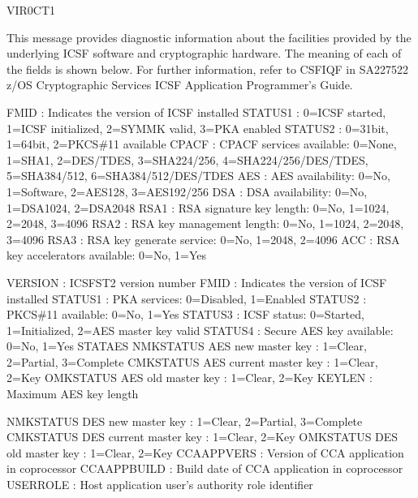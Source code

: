 \documentclass[letterpaper,10pt,english]{sphinxmanual}
\begin{document}
\begin{description}
\sphinxAtStartPar
VIR0CT1

\sphinxAtStartPar
This message provides diagnostic information about the facilities provided by the underlying ICSF software and cryptographic hardware. The meaning of each of the fields is shown below. For further information, refer to CSFIQF in SA22\sphinxhyphen{}7522 z/OS Cryptographic Services ICSF Application Programmer’s Guide.

\sphinxAtStartPar
FMID : Indicates the version of ICSF installed
STATUS1 : 0=ICSF started, 1=ICSF initialized, 2=SYM\sphinxhyphen{}MK valid, 3=PKA enabled STATUS2 : 0=31\sphinxhyphen{}bit, 1=64\sphinxhyphen{}bit, 2=PKCS\#11 available
CPACF : CPACF services available: 0=None, 1=SHA\sphinxhyphen{}1, 2=DES/TDES, 3=SHA\sphinxhyphen{}224/256, 4=SHA\sphinxhyphen{}224/256/DES/TDES, 5=SHA\sphinxhyphen{}384/512, 6=SHA\sphinxhyphen{}384/512/DES/TDES
AES : AES availability: 0=No, 1=Software, 2=AES\sphinxhyphen{}128, 3=AES\sphinxhyphen{}192/256 DSA : DSA availability: 0=No, 1=DSA\sphinxhyphen{}1024, 2=DSA\sphinxhyphen{}2048
RSA1 : RSA signature key length: 0=No, 1=1024, 2=2048, 3=4096 RSA2 : RSA key management length: 0=No, 1=1024, 2=2048, 3=4096 RSA3 : RSA key generate service: 0=No, 1=2048, 2=4096
ACC : RSA key accelerators available: 0=No, 1=Yes

\sphinxAtStartPar
VERSION : ICSFST2 version number
FMID : Indicates the version of ICSF installed STATUS1 : PKA services: 0=Disabled, 1=Enabled STATUS2 : PKCS\#11 available: 0=No, 1=Yes
STATUS3 : ICSF status: 0=Started, 1=Initialized, 2=AES master key valid STATUS4 : Secure AES key available: 0=No, 1=Yes
STATAES
NMK\sphinxhyphen{}STATUS AES new master key : 1=Clear, 2=Partial, 3=Complete CMK\sphinxhyphen{}STATUS AES current master key : 1=Clear, 2=Key
OMK\sphinxhyphen{}STATUS AES old master key : 1=Clear, 2=Key KEYLEN : Maximum AES key length

\sphinxAtStartPar
NMK\sphinxhyphen{}STATUS DES new master key : 1=Clear, 2=Partial, 3=Complete CMK\sphinxhyphen{}STATUS DES current master key : 1=Clear, 2=Key
OMK\sphinxhyphen{}STATUS DES old master key : 1=Clear, 2=Key
CCA\sphinxhyphen{}APP\sphinxhyphen{}VERS : Version of CCA application in co\sphinxhyphen{}processor CCA\sphinxhyphen{}APP\sphinxhyphen{}BUILD : Build date of CCA application in co\sphinxhyphen{}processor USER\sphinxhyphen{}ROLE : Host application user’s authority role identifier


\end{description}
\end{document}
